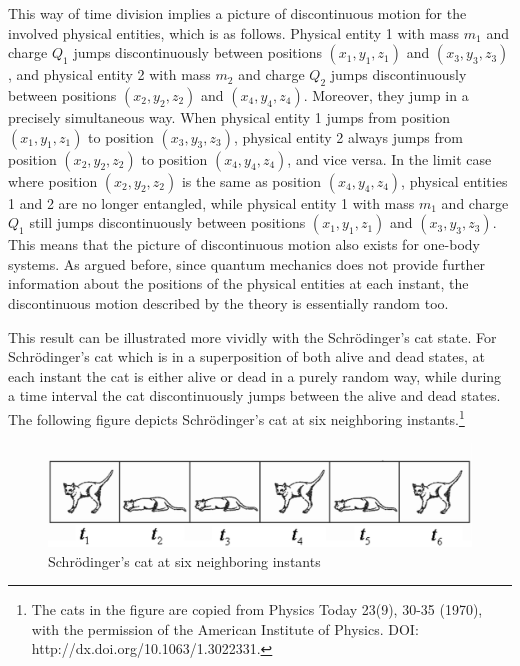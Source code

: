 
This way of time division implies a picture of discontinuous motion for the involved physical entities, which is as follows. Physical entity 1 with mass $m_1$ and charge $Q_1$ jumps discontinuously between positions $(x_1,y_1,z_1)$ and $(x_3, y_3, z_3)$, and physical entity 2 with mass $m_2$ and charge $Q_2$ jumps discontinuously between positions $(x_2,y_2,z_2)$ and $(x_4, y_4, z_4)$. Moreover, they jump in a precisely simultaneous way. When physical entity 1 jumps from position $(x_1,y_1,z_1)$ to position $(x_3, y_3, z_3)$, physical entity 2 always jumps from position $(x_2,y_2,z_2)$ to position $(x_4, y_4, z_4)$, and vice versa.  In the limit case where position $(x_2,y_2,z_2)$ is the same as position $(x_4, y_4, z_4)$, physical entities 1 and 2 are no longer entangled, while physical entity 1 with mass $m_1$ and charge $Q_1$ still jumps discontinuously between positions $(x_1,y_1,z_1)$ and $(x_3, y_3, z_3)$. This means that the picture of discontinuous motion also exists for one-body systems. As argued before, since quantum mechanics does not provide further information about the positions of the physical entities at each instant, the discontinuous motion described by the theory is  essentially random too.

This result can be illustrated more vividly with the Schr\"{o}dinger's cat state. For Schr\"{o}dinger's cat which is in a superposition of both alive and dead states, at each instant the cat is either alive or dead in a purely random way, while during a time interval the cat discontinuously jumps between the alive and dead states. The following figure depicts Schr\"{o}dinger's cat at six neighboring instants.\footnote{The cats in the figure are copied from Physics Today 23(9), 30-35 (1970), with the permission of the American Institute of Physics. DOI: http://dx.doi.org/10.1063/1.3022331.}

\begin{center} 
\begin{figure}[h]\label{schcat}

\includegraphics[scale=0.20]{fig72.jpg}


\caption{Schr\"{o}dinger's cat at six neighboring instants}

\end{figure}

 \end{center} 

